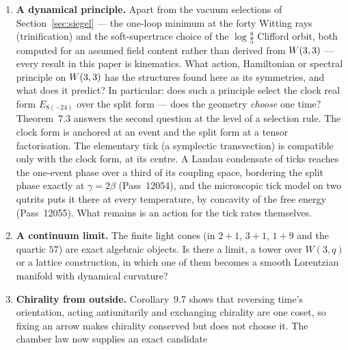 \begin{enumerate}[label=\textbf{\arabic*.},leftmargin=1.6em,itemsep=5pt]
\begin{itemize}
            and the light generations stay degenerate under every vacuum and Higgs choice tried);
      \item twists and lattices not yet scanned --- with two routes already closed: the non-supersymmetric
            $SO(16)\times SO(16)$ realisation on $T^6/\Z_3$ (Section~\ref{sec:real}), and Scherk--Schwarz interpolation on all nine
            families (Theorem~7.6), and, on the native $A_2$ Narain lattice, for asymmetric twists as well;
      \item a mechanism other than a parity for proton stability.
      \end{itemize}
\item \textbf{A dynamical principle.} Apart from the vacuum selections of Section~\ref{sec:siegel} --- the
      one-loop minimum at the forty Witting rays (trinification) and the soft-supertrace choice of the
      $\log\tfrac85$ Clifford orbit, both computed for an assumed field content rather than derived from
      $W(3,3)$ --- every result in this paper is kinematics. What
      action, Hamiltonian or spectral principle on $W(3,3)$ has the structures found here as its
      symmetries, and what does it predict? In particular: does such a principle select the
      clock real form $E_{8(-24)}$ over the split form --- does the geometry
      \emph{choose} one time? Theorem~7.3 answers the second question at the level of a selection rule. The clock
      form is anchored at an event and the split form at a tensor factorisation. The elementary tick (a symplectic
      transvection) is compatible only with the clock form, at its centre. A Landau condensate of ticks reaches the one-event phase
      over a third of its coupling space, bordering the split phase exactly at $\gamma=2\beta$ (Pass~12054), and the microscopic tick model on two qutrits puts it there at every temperature, by concavity of the
      free energy (Pass~12055). What remains is an action for the tick rates themselves.
\item \textbf{A continuum limit.} The finite light cones (in $2+1$, $3+1$, $1+9$ and the
      quartic $57$) are exact algebraic objects. Is there a limit, a tower over $W(3,q)$ or a
      lattice construction, in which one of them becomes a smooth Lorentzian manifold with
      dynamical curvature?
\item \textbf{Chirality from outside.} Corollary~9.7 shows that reversing time's orientation,
      acting antiunitarily and exchanging chirality are one coset, so fixing an arrow makes
      chirality conserved but does not choose it. The chamber law now supplies an exact candidate

\end{enumerate}
